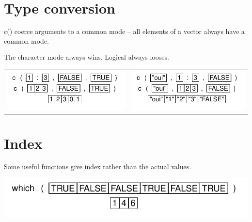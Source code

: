 \documentclass[pdflatex]{article}
\begin{document}
\section{Type conversion}

c() coerce arguments to a common mode -- all elements of a vector always have a common mode.

The character mode always wins. Logical always looses.

\begin{tabular}{cc}
\includegraphics{conversion_1} & \includegraphics{conversion}\\
\end{tabular}


\section{Index}

Some useful functions give index rather than the actual values.

\includegraphics{which}
\end{document}
